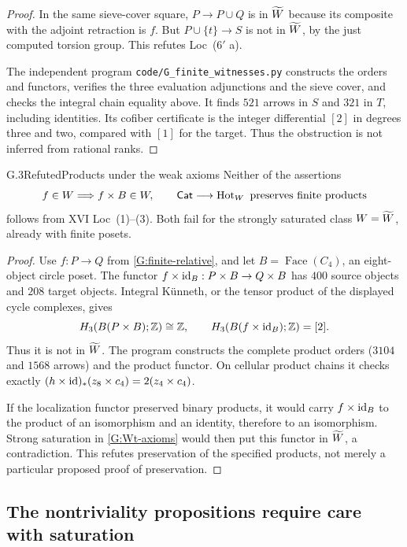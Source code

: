 \begin{proof}
In the same sieve-cover square, $P\to P\cup Q$ is in $\widetilde W$ because
its composite with the adjoint retraction is $f$.  But
$P\cup\{t\}\to S$ is not in $\widetilde W$, by the just computed torsion
group.  This refutes Loc~($6'$ a).

The independent program \texttt{code/G\_finite\_witnesses.py} constructs
the orders and functors, verifies the three evaluation adjunctions and
the sieve cover, and checks the integral chain equality above.  It
finds $521$ arrows in $S$ and $321$ in $T$, including identities.
Its cofiber certificate is the integer differential $[2]$ in degrees
three and two, compared with $[1]$ for the target.  Thus the obstruction
is not inferred from rational ranks.
\end{proof}

\begin{claim}{G.3}{Refuted}{Products under the weak axioms}
\label{G:products-fail}
Neither of the assertions
\[
 f\in W\Longrightarrow f\times B\in W,
 \qquad \mathsf{Cat}\longrightarrow\operatorname{Hot}_W\text{ preserves finite products}
\]
follows from XVI Loc~(1)--(3).  Both fail for the strongly saturated
class $W=\widetilde W$, already with finite posets.
\end{claim}
\begin{proof}
Use $f:P\to Q$ from \ref{G:finite-relative}, and let
$B=\operatorname{Face}(C_4)$, an eight-object circle poset.  The functor
$f\times\mathrm{id}_B:P\times B\to Q\times B$ has $400$ source objects
and $208$ target objects.  Integral K\"unneth, or the tensor product of
the displayed cycle complexes, gives
\[
 H_3(B(P\times B);\mathbb Z)\cong\mathbb Z,
 \qquad H_3(B(f\times\mathrm{id}_B);\mathbb Z)=[2].
\]
Thus it is not in $\widetilde W$.  The program constructs the complete product
orders ($3104$ and $1568$ arrows) and the product functor.  On cellular
product chains it checks exactly
$(h\times\mathrm{id})_*(z_8\times c_4)=2(z_4\times c_4)$.

If the localization functor preserved binary products, it would carry
$f\times\mathrm{id}_B$ to the product of an isomorphism and an identity,
therefore to an isomorphism.  Strong saturation in
\ref{G:Wt-axioms} would then put this functor in $\widetilde W$, a contradiction.
This refutes preservation of the specified products, not merely a
particular proposed proof of preservation.
\end{proof}

\subsection{The nontriviality propositions require care with saturation}

